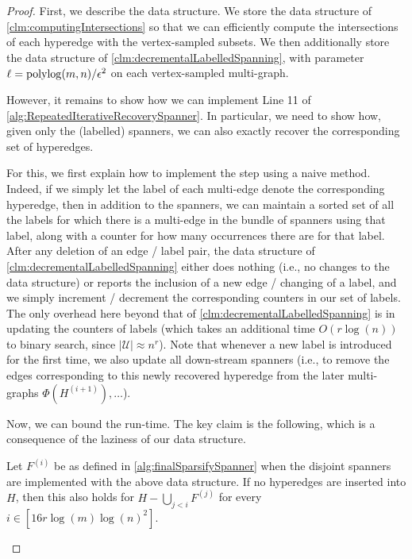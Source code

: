 \documentclass{article}
\begin{document}
\begin{proof}
    First, we describe the data structure. We store the data structure of \cref{clm:computingIntersections} so that we can efficiently compute the intersections of each hyperedge with the vertex-sampled subsets. We then additionally store the data structure of \cref{clm:decrementalLabelledSpanning}, with parameter $\ell = \operatorname{polylog}(m,n) / \epsilon^2$ on each vertex-sampled multi-graph. 
    
    However, it remains to show how we can implement Line 11 of \cref{alg:RepeatedIterativeRecoverySpanner}. In particular, we need to show how, given only the (labelled) spanners, we can also exactly recover the corresponding set of hyperedges. 
    
    For this, we first explain how to implement the step using a naive method. Indeed, if we simply let the label of each multi-edge denote the corresponding hyperedge, then in addition to the spanners, we can maintain a sorted set of all the labels for which there is a multi-edge in the bundle of spanners using that label, along with a counter for how many occurrences there are for that label. After any deletion of an edge / label pair, the data structure of \cref{clm:decrementalLabelledSpanning} either does nothing (i.e., no changes to the data structure) or reports the inclusion of a new edge / changing of a label, and we simply increment / decrement the corresponding counters in our set of labels. The only overhead here beyond that of \cref{clm:decrementalLabelledSpanning} is in updating the counters of labels (which takes an additional time $O(r \log(n))$ to binary search, since $|\mathcal{U}| \approx n^r$). Note that whenever a new label is introduced for the first time, we also update all down-stream spanners (i.e.,  to remove the edges corresponding to this newly recovered hyperedge from the later multi-graphs $\Phi(H^{(i+1)}), \dots$).


    Now, we can bound the run-time. The key claim is the following, which is a consequence of the laziness of our data structure.

    \begin{claim}
        Let $F^{(i)}$ be as defined in \cref{alg:finalSparsifySpanner} when the disjoint spanners are implemented with the above data structure. If no hyperedges are inserted into $H$, then this also holds for $H - \bigcup_{j < i} F^{(j)}$ for every $i \in [16r\log(m)\log(n)^2]$.
    \end{claim}


\end{proof}
\end{document}
